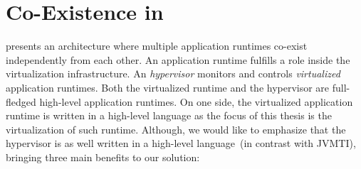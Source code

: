 




\section{Co-Existence in \Vtt} \label{sec:virtualization_overview}

\Vtt presents an architecture where multiple application runtimes co-exist independently from each other. An application runtime fulfills a role inside the virtualization infrastructure. An \emph{hypervisor} monitors and controls \emph{virtualized} application runtimes. Both the virtualized runtime and the hypervisor are full-fledged high-level application runtimes. On one side, the virtualized application runtime is written in a high-level language as the focus of this thesis is the virtualization of such runtime. Although, we would like to emphasize that the hypervisor is as well written in a high-level language~(in contrast with \eg JVMTI\cite{JVMPI}), bringing three main benefits to our solution:

